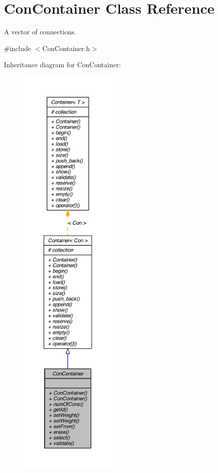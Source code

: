 \hypertarget{class_con_container}{
\section{ConContainer Class Reference}
\label{class_con_container}
}


A vector of connections.  




{\ttfamily \#include $<$ConContainer.h$>$}



Inheritance diagram for ConContainer:\nopagebreak
\begin{figure}[H]
\begin{center}
\leavevmode
\includegraphics[height=600pt]{class_con_container__inherit__graph}
\end{center}
\end{figure}


